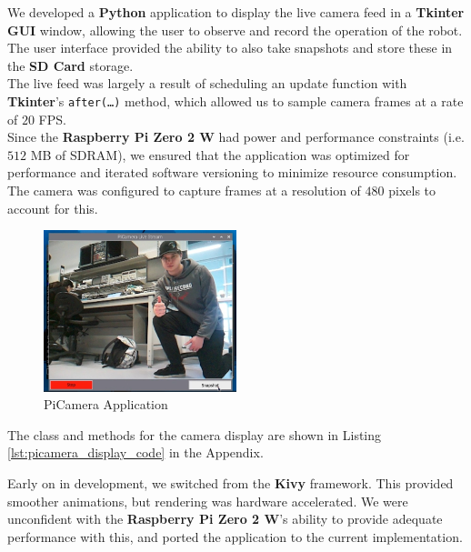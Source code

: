\documentclass{article}
\begin{document}
\begin{minipage}{\linewidth}
    We developed a \textbf{Python} application to display the live camera feed in a \textbf{Tkinter GUI} window,
    allowing the user to observe and record the operation of the robot. The user interface provided the ability to also
    take snapshots and store these in the \textbf{SD Card} storage. \\

    The live feed was largely a result of scheduling an update function with \textbf{Tkinter}'s \texttt{after(\dots)} method,
    which allowed us to sample camera frames at a rate of $20$ FPS. \\

    Since the \textbf{Raspberry Pi Zero 2 W} had power and performance constraints (i.e. $512$ MB of SDRAM),
    we ensured that the application was optimized for performance and iterated software versioning
    to minimize resource consumption. The camera was configured to capture frames at a resolution of $480$ pixels to account for this. \\
\end{minipage}

\begin{figure}[H]
    \centering
    \includegraphics[width=0.5\textwidth]{Figures/PiCamera_App.jpg}
    \caption{PiCamera Application}
    \label{fig:camera_app}
\end{figure}

\begin{center}
    The class and methods for the camera display are shown in Listing \ref{lst:picamera_display_code} in the Appendix. \\
\end{center}


\begin{minipage}{\linewidth}
    Early on in development, we switched from the \textbf{Kivy} framework. This provided smoother animations, but rendering was
    hardware accelerated. We were unconfident with the \textbf{Raspberry Pi Zero 2 W}'s ability to provide adequate performance with this,
    and ported the application to the current implementation.
\end{minipage}
\end{document}
